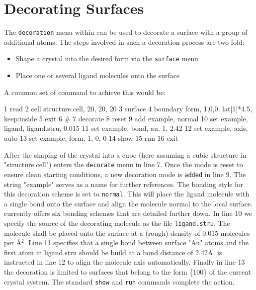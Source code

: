 
\section{Decorating Surfaces \label{mod-deco}}

The {\tt decoration} menu within \Discus can be used to decorate
a surface with a group of additional atoms. The steps involved in such
a decoration process are two fold:
\begin{itemize}
\item Shape a crystal into the desired form via the {\tt surface} menu
\item Place one or several ligand molecules onto the surface
\end{itemize}

A common set of command to achieve this would be:
\begin{MacVerbatim}
 1  read
 2     cell structure.cell, 20, 20, 20
 3  surface
 4     boundary form, 1,0,0, lat[1]*4.5, keep:inside
 5  exit
 6  #
 7  decorate
 8     reset
 9     add example, normal
10     set example, ligand, ligand.stru, 0.015
11     set example, bond,   au, 1, 2.42
12     set example, axis, auto
13     set example, form,  1, 0, 0
14     show
15     run
16  exit
\end{MacVerbatim}

After the shaping of the crystal into a cube (here assuming a cubic 
structure in "structure.cell") \Discus enters the {\tt decorate} menu
in line 7. Once the mode is reset to ensure clean starting conditions,
a new decoration mode is {\tt added} in line 9. The string "example"
serves as a name for further references. The bonding style for this
decoration scheme is set to {\tt normal}. This will place the ligand
molecule with a single bond onto the surface and align the molecule
normal to the local surface. \Discus currently offers six bonding
schemes that are detailed further down. In line 10 we specify the
source of the decorating molecule as the file {\tt ligand.stru}. 
The molecule shall be placed onto the surface at a (rough) density of 
0.015 molecules per \AA$^2$. Line 11 specifies that a 
single bond between surface "Au" atoms and the first atom in 
ligand.stru should be build at a bond distance of 2.42\AA. \Discus is 
instructed in line 12 to align the molecule axis automatically.
Finally in line 13 the decoration is limited to surfaces that 
belong to the form \{100\} of the current crystal system. The 
standard {\tt show} and {\tt run} commands complete the action.

